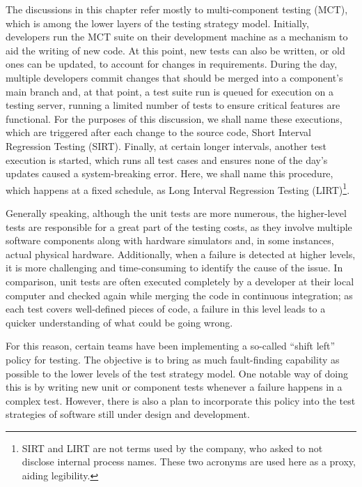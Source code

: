 The discussions in this chapter refer mostly to multi-component testing (MCT), which is among the lower layers of the testing strategy model.
Initially, developers run the MCT suite on their development machine as a mechanism to aid the writing of new code.
At this point, new tests can also be written, or old ones can be updated, to account for changes in requirements.
During the day, multiple developers commit changes that should be merged into a component's main branch and, at that point, a test suite run is queued for execution on a testing server, running a limited number of tests to ensure critical features are functional.
For the purposes of this discussion, we shall name these executions, which are triggered after each change to the source code, Short Interval Regression Testing (SIRT).
Finally, at certain longer intervals, another test execution is started, which runs all test cases and ensures none of the day's updates caused a system-breaking error.
Here, we shall name this procedure, which happens at a fixed schedule, as Long Interval Regression Testing (LIRT)\footnote{SIRT and LIRT are not terms used by the company, who asked to not disclose internal process names. These two acronyms are used here as a proxy, aiding legibility.}.

Generally speaking, although the unit tests are more numerous, the higher-level tests are responsible for a great part of the testing costs, as they involve multiple software components along with hardware simulators and, in some instances, actual physical hardware.
Additionally, when a failure is detected at higher levels, it is more challenging and time-consuming to identify the cause of the issue.
In comparison, unit tests are often executed completely by a developer at their local computer and checked again while merging the code in continuous integration; as each test covers well-defined pieces of code, a failure in this level leads to a quicker understanding of what could be going wrong.

For this reason, certain teams have been implementing a so-called ``shift left'' policy for testing.
The objective is to bring as much fault-finding capability as possible to the lower levels of the test strategy model.
One notable way of doing this is by writing new unit or component tests whenever a failure happens in a complex test.
However, there is also a plan to incorporate this policy into the test strategies of software still under design and development.


